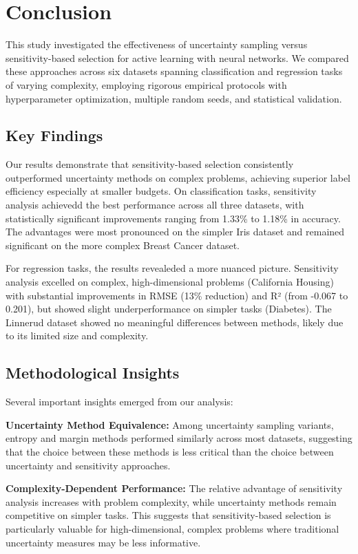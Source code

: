 \documentclass[conference]{IEEEtran}
\begin{document}
\section{Conclusion}

This study investigated the effectiveness of uncertainty sampling versus sensitivity-based selection for active learning with neural networks. We compared these approaches across six datasets spanning classification and regression tasks of varying complexity, employing rigorous empirical protocols with hyperparameter optimization, multiple random seeds, and statistical validation.

\subsection{Key Findings}

Our results demonstrate that sensitivity-based selection consistently outperformed uncertainty methods on complex problems, achieving superior label efficiency especially at smaller budgets. On classification tasks, sensitivity analysis achievedd the best performance across all three datasets, with statistically significant improvements ranging from 1.33\% to 1.18\% in accuracy. The advantages were most pronounced on the simpler Iris dataset and remained significant on the more complex Breast Cancer dataset.

For regression tasks, the results revealeded a more nuanced picture. Sensitivity analysis excelled on complex, high-dimensional problems (California Housing) with substantial improvements in RMSE (13\% reduction) and R² (from -0.067 to 0.201), but showed slight underperformance on simpler tasks (Diabetes). The Linnerud dataset showed no meaningful differences between methods, likely due to its limited size and complexity.

\subsection{Methodological Insights}

Several important insights emerged from our analysis:

\textbf{Uncertainty Method Equivalence:} Among uncertainty sampling variants, entropy and margin methods performed similarly across most datasets, suggesting that the choice between these methods is less critical than the choice between uncertainty and sensitivity approaches.

\textbf{Complexity-Dependent Performance:} The relative advantage of sensitivity analysis increases with problem complexity, while uncertainty methods remain competitive on simpler tasks. This suggests that sensitivity-based selection is particularly valuable for high-dimensional, complex problems where traditional uncertainty measures may be less informative.
\end{document}
